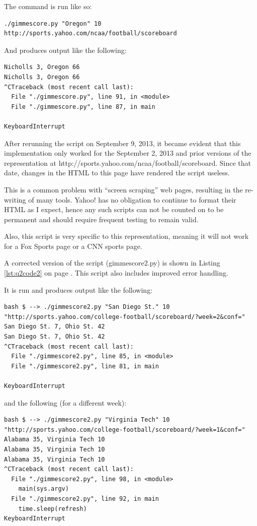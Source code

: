 \documentclass[letterpaper,11pt]{article}
\begin{document}
The command is run like so:
\begin{lstlisting}[frame=single]
./gimmescore.py "Oregon" 10 http://sports.yahoo.com/ncaa/football/scoreboard
\end{lstlisting}

And produces output like the following:
\begin{lstlisting}[frame=single]
Nicholls 3, Oregon 66
Nicholls 3, Oregon 66
^CTraceback (most recent call last):
  File "./gimmescore.py", line 91, in <module>
  File "./gimmescore.py", line 87, in main
    
KeyboardInterrupt
\end{lstlisting}

After rerunning the script on September 9, 2013, it became evident that this implementation only worked for the September 2, 2013 and prior versions of the representation at http://sports.yahoo.com/ncaa/football/scoreboard.  Since that date, changes in the HTML to this page have rendered the script useless.

This is a common problem with ``screen scraping'' web pages, resulting in the re-writing of many tools.  Yahoo! has no obligation to continue to format their HTML as I expect, hence any such scripts can not be counted on to be permanent and should require frequent testing to remain valid.

Also, this script is very specific to this representation, meaning it will not work for a Fox Sports page or a CNN sports page.

\newpage
A corrected version of the script (gimmescore2.py) is shown in Listing \ref{lst:q2code2} on page \pageref{lst:q2code2}.  This script also includes improved error handling.

It is run and produces output like the following:
\begin{lstlisting}[frame=single]
bash $ --> ./gimmescore2.py "San Diego St." 10 "http://sports.yahoo.com/college-football/scoreboard/?week=2&conf="
San Diego St. 7, Ohio St. 42
San Diego St. 7, Ohio St. 42
^CTraceback (most recent call last):
  File "./gimmescore2.py", line 85, in <module>
  File "./gimmescore2.py", line 81, in main
    
KeyboardInterrupt

\end{lstlisting}

and the following (for a different week):
\begin{lstlisting}[frame=single]
bash $ --> ./gimmescore2.py "Virginia Tech" 10 "http://sports.yahoo.com/college-football/scoreboard/?week=1&conf="
Alabama 35, Virginia Tech 10
Alabama 35, Virginia Tech 10
Alabama 35, Virginia Tech 10
^CTraceback (most recent call last):
  File "./gimmescore2.py", line 98, in <module>
    main(sys.argv)
  File "./gimmescore2.py", line 92, in main
    time.sleep(refresh)
KeyboardInterrupt
\end{lstlisting}
\end{document}
